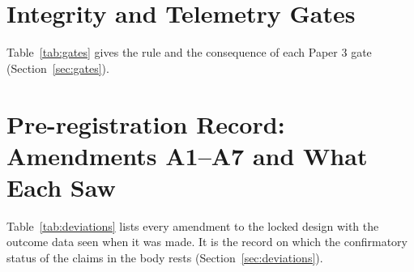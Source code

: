 \documentclass[sigconf]{acmart}
\begin{document}
\section{Integrity and Telemetry Gates}
\label{app:gates}
Table~\ref{tab:gates} gives the rule and the consequence of each Paper 3 gate (Section~\ref{sec:gates}).

\section{Pre-registration Record: Amendments A1--A7 and What Each Saw}
\label{app:amendments}
Table~\ref{tab:deviations} lists every amendment to the locked design with the outcome data seen
when it was made. It is the record on which the confirmatory status of the claims in the body
rests (Section~\ref{sec:deviations}).

\end{document}
